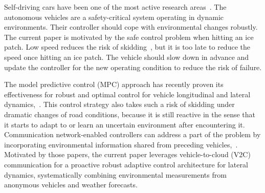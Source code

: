 \documentclass[letterpaper, 10 pt, conference]{ieeeconf}
\begin{document}

Self-driving cars have been one of the most active research areas~\cite{paden2016survey}. %
The autonomous vehicles are a safety-critical system operating in dynamic environments. Their controller should cope with environmental changes robustly.
The current paper is motivated by the safe control problem when hitting an ice patch. Low speed reduces the risk of skidding~\cite{roe1998high}, but it is too late to reduce the speed once hitting an ice patch. The vehicle should slow down in advance and update the controller for the new operating condition to reduce the risk of failure.

The model predictive control (MPC) approach has recently proven its effectiveness for robust and optimal control for vehicle longitudinal and lateral dynamics,~\cite{falcone2007predictive,funke2016collision,williams2018best,carvalho2014stochastic}.
This control strategy also takes such a risk of skidding under dramatic changes of road conditions, because it is still reactive in the sense that it starts to adapt to or learn an uncertain environment after encountering it.
Communication network-enabled controllers can address a part of the problem by incorporating environmental information shared from preceding vehicles,~\cite{na2020disturbance,bertoni2017adaptive}. Motivated by those papers, the current paper leverages vehicle-to-cloud (V2C) communication for a proactive robust adaptive control architecture for lateral dynamics, systematically combining environmental measurements from anonymous vehicles and weather forecasts.
\end{document}
